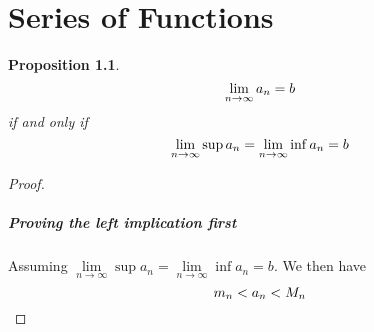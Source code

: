 \documentclass[a4paper]{report}
\newtheorem{prop}{Proposition}
\begin{document}
\chapter{Series of Functions}

\begin{prop}
  \begin{equation}
    \notag
    \lim\limits_{n\rightarrow\infty} a_{n} = b
  \end{equation}
  if and only if
  \begin{equation}
    \notag
    \lim\limits_{n\rightarrow\infty}\sup a_{n} = \lim\limits_{n\rightarrow\infty}\inf a_{n} = b
  \end{equation}
\end{prop}
\begin{proof}
  \item\paragraph{Proving the left implication first}
  Assuming $\lim\limits_{n\rightarrow\infty}\sup a_{n} = \lim\limits_{n\rightarrow\infty}\inf a_{n} = b$.
  We then have
  \begin{equation}
    \notag
    m_{n} < a_{n} < M_{n}
  \end{equation}

\end{proof}
\end{document}
